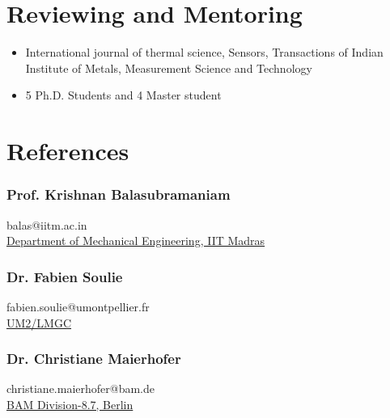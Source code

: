 \documentclass{my_cv}%
\begin{document}
\section{Reviewing and Mentoring}
\vspace{1em}
\begin{itemize}[leftmargin=0.15in]
\setlength\itemsep{-0.1em}
\color{mygray}
\item International journal of thermal science, Sensors, Transactions of Indian Institute of Metals, Measurement Science and Technology
\item 5 Ph.D. Students and 4 Master student 
\end{itemize}
\section{References}
\vspace{1em}
\begin{minipage}{0.6\textwidth}
\subsubsection{Prof. Krishnan Balasubramaniam} 
\faAt \hspace{0.2em} balas@iitm.ac.in \\
\hspace{0.5em} \faInstitution \hspace{0.2em} \href{http://iitm.irins.org/profile/50968}{Department of Mechanical Engineering, IIT Madras}
\vspace{1.5em}
\subsubsection{Dr. Fabien Soulie} 
\faAt \hspace{0.2em} fabien.soulie@umontpellier.fr\\ \hspace{0.2em}\faInstitution \hspace{0.2em}  \href{http://www.lmgc.univ-montp2.fr/spip.php?page=pageperso&nom=SOULIE&prenom=Fabien&lang=fr}{UM2/LMGC}
\vspace{1.2em}
\subsubsection{Dr. Christiane Maierhofer} 
\faAt \hspace{0.2em} christiane.maierhofer@bam.de\\ 
\faInstitution \hspace{0.2em}   \href{https://www.bam.de/Navigation/EN/About-us/Organisation/Organisation-Chart/President/Department-8/Division-87/division87.html}{BAM Division-8.7, Berlin} 
\vspace{1em}
\end{minipage}
\end{document}
